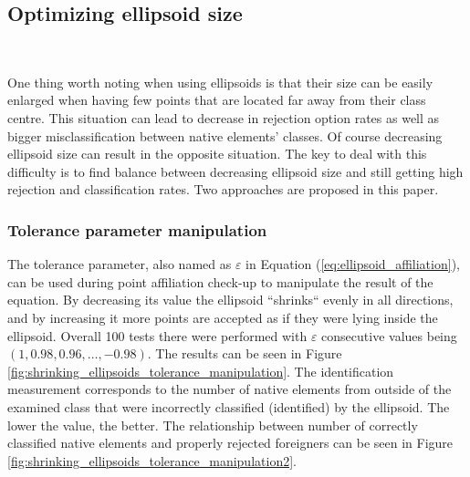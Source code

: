 \subsection{Optimizing ellipsoid size} \ \label{size_optimizing}

One thing worth noting when using ellipsoids is that their size can be easily enlarged when having few points that are located far away from their class centre. This situation can lead to decrease in rejection option rates as well as bigger misclassification between native elements' classes. Of course decreasing ellipsoid size can result in the opposite situation. The key to deal with this difficulty is to find balance between decreasing ellipsoid size and still getting high rejection and classification rates. Two approaches are proposed in this paper.

\subsubsection{Tolerance parameter manipulation}

The tolerance parameter, also named as $\varepsilon$ in Equation (\ref{eq:ellipsoid_affiliation}), can be used during point affiliation check-up to manipulate the result of the equation. By decreasing its value the ellipsoid ``shrinks`` evenly in all directions, and by increasing it more points are accepted as if they were lying inside the ellipsoid. Overall 100 tests there were performed with $\varepsilon$ consecutive values being~$(1, 0.98, 0.96, \dots, -0.98)$. The results can be seen in Figure \ref{fig:shrinking_ellipsoids_tolerance_manipulation}. The identification measurement corresponds to the number of native elements from outside of the examined class that were incorrectly classified (identified) by the ellipsoid. The lower the value, the better. The relationship between number of correctly classified native elements and properly rejected foreigners can be seen in Figure \ref{fig:shrinking_ellipsoids_tolerance_manipulation2}.

